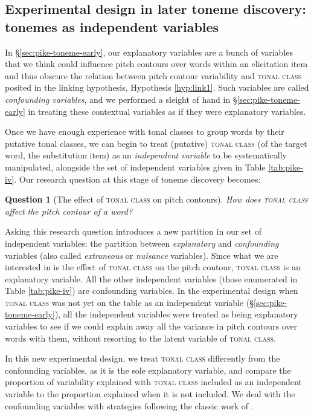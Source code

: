 \documentclass[12pt]{article}
\newtheorem{question}{Question}
\begin{document}
\subsection{Experimental design in later toneme discovery: tonemes as
  independent variables}
\label{sec:pike-toneme-design}

In \S\ref{sec:pike-toneme-early}, our explanatory variables are a
bunch of variables that we think could influence pitch contours over
words within an elicitation item and thus obscure the relation between
pitch contour variability and \textsc{tonal class} posited in
the linking hypothesis, Hypothesis \ref{hyp:link1}. Such variables are called
\textit{confounding variables}, and we performed a sleight of hand in
\S\ref{sec:pike-toneme-early} in treating these contextual variables
as if they were explanatory variables.

Once we have enough experience with tonal classes to group words by
their putative tonal classes, we can begin to treat (putative)
\textsc{tonal class} (of the target word, the substitution item) as an
\textit{independent variable} to be systematically manipulated,
alongside the set of independent variables given in Table
\ref{tab:pike-iv}. 
Our research question at this stage of toneme discovery becomes:

\begin{question}[The effect of \textsc{tonal class} on pitch contours]
\hfill\break
How does \textsc{tonal class} affect the pitch contour of a word? 
\end{question}


Asking this research question introduces a new partition in our set of
independent variables: the partition between \textit{explanatory} and
\textit{confounding} variables (also called \textit{extraneous} or
\textit{nuisance} variables). Since what we are interested in is the
effect of \textsc{tonal class} on the pitch contour, \textsc{tonal
class} is an explanatory variable. All the other independent variables
(those enumerated in Table \ref{tab:pike-iv}) are confounding
variables. In the experimental design when \textsc{tonal class} was
not yet on the table as an independent variable (\S\ref{sec:pike-toneme-early}), all
the independent variables were treated as being explanatory variables
to see if we could explain away all the variance in pitch contours
over words with them, without resorting to the latent variable of
\textsc{tonal class}. 

In this new experimental design, we treat
\textsc{tonal class} differently
from the confounding variables, as it is the sole explanatory
variable, and compare the proportion of variability explained with
\textsc{tonal class} included as an independent variable to the
proportion explained when it is not included. We deal with the confounding variables
with strategies following the classic work of \citet{Fisher:1925,Fisher:1935}.
\end{document}
